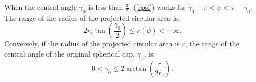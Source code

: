 \documentclass[final]{IEEEtran}
\begin{document}
When the central angle $\gamma_0$ is less than $\frac{\pi}{2}$, (\ref{rpsi}) works for $\gamma_0-\pi<\psi<\pi-\gamma_0$. The range of the radius of the projected circular area is:
\begin{equation}
    2r_e \tan(\frac{\gamma_0}{2})\leq r(\psi)<+\infty.
\end{equation}
Conversely, if the radius of the projected circular area is $r$, the range of the central angle of the original spherical cap, $\gamma_0$, is:
\begin{equation}
    0<\gamma_0\leq 2\arctan(\frac{r}{2r_e}).
\label{gamma0range}
\end{equation}
\end{document}
